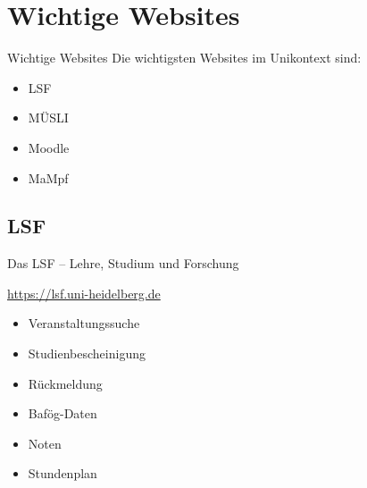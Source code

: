 \section{Wichtige Websites}
\begin{frame}{Wichtige Websites}
    \large Die wichtigsten Websites im Unikontext sind:
    \begin{itemize}
        \item{LSF}
        \item{MÜSLI}
        \item{Moodle}
        \item{MaMpf}
    \end{itemize}
\end{frame}


\subsection{LSF}
\begin{frame}{Das LSF -- Lehre, Studium und Forschung}

    \large \url{https://lsf.uni-heidelberg.de} \\
    \begin{minipage}[t]{0.515\textwidth}
        \begin{itemize}
            \item{Veranstaltungssuche}
            \item{Studienbescheinigung}
            \item{Rückmeldung}
            \item{Bafög-Daten}
            \item{Noten}
            \item{Stundenplan}
        \end{itemize}
    \end{minipage}
    \begin{minipage}[t]{0.4\textwidth}
        \vspace{0.4cm}
        \begin{center}
        \end{center}
    \end{minipage}
\end{frame}

